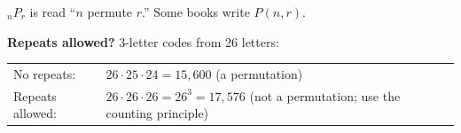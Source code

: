 \documentclass[11pt]{article}
\begin{document}
\vspace{0.4em}
${}_nP_r$ is read ``$n$ permute $r$.'' Some books write $P(n, r)$.

\vspace{0.8em}
\textbf{Repeats allowed?} 3-letter codes from 26 letters:

\vspace{0.2em}
\begin{tabular}{@{}ll}
No repeats: & $26 \cdot 25 \cdot 24 = 15{,}600$ \quad (a permutation)\\
Repeats allowed: & $26 \cdot 26 \cdot 26 = 26^3 = 17{,}576$ \quad (not a permutation; use the counting principle)\\
\end{tabular}

\partner

\newpage
\end{document}
